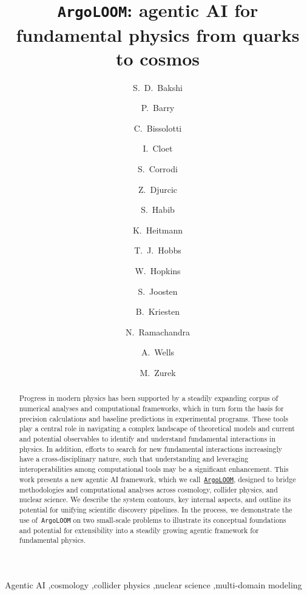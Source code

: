 \documentclass[final,3p,times,sort,compress]{elsarticle}
\newcommand{\AL}{\texttt{ArgoLOOM}\xspace}
\begin{document}
\begin{frontmatter}

\title{\texttt{ArgoLOOM}: agentic AI for fundamental physics from quarks to cosmos}


\author[one]{S.~D.~Bakshi}
\author[two]{P.~Barry}
\author[two]{C.~Bissolotti}
\author[two]{I.~Cloet}
\author[one]{S.~Corrodi}
\author[one]{Z.~Djurcic}
\author[three]{S.~Habib}
\author[one]{K.~Heitmann}
\author[one]{T.~J.~Hobbs}
\author[one]{W.~Hopkins}
\author[two]{S.~Joosten}
\author[one]{B.~Kriesten}
\author[three]{N.~Ramachandra}
\author[three]{A.~Wells}
\author[two]{M.~Zurek}




\begin{abstract}
%
Progress in modern physics has been supported by a steadily expanding corpus of numerical
analyses and computational frameworks, which in turn form the basis for precision calculations and baseline predictions in experimental programs.
%
These tools play a central role in navigating a complex landscape of theoretical models and current
and potential observables to identify and understand fundamental interactions in physics.
%
In addition, efforts to search for new fundamental interactions increasingly have a
cross-disciplinary nature, such that understanding and leveraging interoperabilities among computational
tools may be a significant enhancement.
%
This work presents a new agentic AI framework, which we call~\href{https://github.com/ML4HEP-Theory/ArgoLOOM}{\AL}, designed to bridge methodologies
and computational analyses across cosmology, collider physics, and nuclear science.
%
We describe the system contours, key internal aspects, and
outline its potential for unifying scientific discovery pipelines.
%
In the process, we demonstrate the use of~\AL on two small-scale problems to illustrate
its conceptual foundations and potential for extensibility into a steadily growing agentic framework
for fundamental physics.
\end{abstract}

\begin{keyword}
Agentic AI \sep cosmology \sep collider physics \sep nuclear science \sep multi-domain modeling
\end{keyword}

\end{frontmatter}
\end{document}
